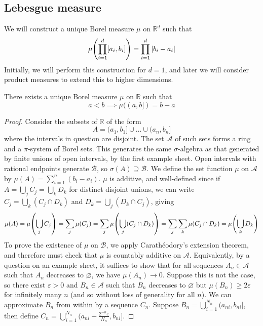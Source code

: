\subsection{Lebesgue measure}
We will construct a unique Borel measure \( \mu \) on \( \mathbb R^d \) such that
\[ \mu\qty(\prod_{i=1}^d [a_i, b_i]) = \prod_{i=1}^d \abs{b_i - a_i} \]
Initially, we will perform this construction for \( d = 1 \), and later we will consider product measures to extend this to higher dimensions.
\begin{theorem}
	There exists a unique Borel measure \( \mu \) on \( \mathbb R \) such that
	\[ a < b \implies \mu((a,b]) = b - a \]
\end{theorem}
\begin{proof}
	Consider the subsets of \( \mathbb R \) of the form
	\[ A = (a_1,b_1] \cup \dots \cup (a_n,b_n] \]
	where the intervals in question are disjoint.
	The set \( \mathcal A \) of such sets forms a ring and a \( \pi \)-system of Borel sets.
	This generates the same \( \sigma \)-algebra as that generated by finite unions of open intervals, by the first example sheet.
	Open intervals with rational endpoints generate \( \mathcal B \), so \( \sigma(A) \supseteq \mathcal B \).
	We define the set function \( \mu \) on \( \mathcal A \) by \( \mu(A) = \sum_{i=1}^n (b_i - a_i) \).
	\( \mu \) is additive, and well-defined since if \( A = \bigcup_j C_j = \bigcup_k D_k \) for distinct disjoint unions, we can write \( C_j = \bigcup_k (C_j \cap D_k) \) and \( D_k = \bigcup_j (D_k \cap C_j) \), giving
	\[ \mu(A) = \mu\qty(\bigcup_j C_j) = \sum_j \mu(C_j) = \sum_j \mu\qty(\bigcup_j (C_j \cap D_k)) = \sum_j \sum_k \mu(C_j \cap D_k) = \mu\qty(\bigcup_k D_k) \]
	To prove the existence of \( \mu \) on \( \mathcal B \), we apply Carath\'eodory's extension theorem, and therefore must check that \( \mu \) is countably additive on \( \mathcal A \).
	Equivalently, by a question on an example sheet, it suffices to show that for all sequences \( A_n \in \mathcal A \) such that \( A_n \) decreases to \( \varnothing \), we have \( \mu(A_n) \to 0 \).
	Suppose this is not the case, so there exist \( \varepsilon > 0 \) and \( B_n \in \mathcal A \) such that \( B_n \) decreases to \( \varnothing \) but \( \mu(B_n) \geq 2\varepsilon \) for infinitely many \( n \) (and so without loss of generality for all \( n \)).
	We can approximate \( B_n \) from within by a sequence \( C_n \).
	Suppose \( B_n = \bigcup_{i=1}^{N_n} (a_{ni},b_{ni}] \), then define \( C_n = \bigcup_{i=1}^{N_n} (a_{ni}+\frac{2^{-n}\varepsilon}{N_n}, b_{ni}] \).

\end{proof}
